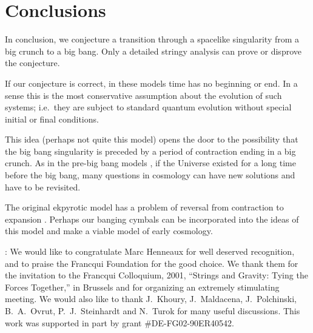 \documentclass[a4paper,12pt,oneside]{article}
\begin{document}
\setcounter{equation}{0}
\section{Conclusions}

In conclusion, we conjecture a transition through a spacelike
singularity from a big crunch to a big bang. Only a detailed
stringy analysis can prove or disprove the conjecture.

If our conjecture is correct, in these models time has no
beginning or end.  In a sense this is the most conservative
assumption about the evolution of such systems; i.e.\ they are
subject to standard quantum evolution without special initial or
final conditions.

This idea (perhaps not quite this model) opens the door to the
possibility that the big bang singularity is preceded by a period
of contraction ending in a big crunch.  As in the pre-big bang
models \cite{PBB}, if the Universe existed for a long time before
the big bang, many questions in cosmology can have new solutions
and have to be revisited.

The original ekpyrotic model \cite{KOST} has a problem of
reversal from contraction to expansion \cite{linde}.  Perhaps our
banging cymbals can be incorporated into the ideas of this model
and make a viable model of early cosmology.

\vspace{5mm}

: We would like to congratulate
Marc Henneaux for well deserved recognition, and to praise the
Francqui Foundation for the good choice.  We thank them for the
invitation to the Francqui Colloquium, 2001, ``Strings and
Gravity: Tying the Forces Together,'' in Brussels and for
organizing an extremely stimulating meeting. We would also like
to thank J.~Khoury, J.~Maldacena, J.~Polchinski, B.~A.~Ovrut,
P.~J.~Steinhardt and N.~Turok for many useful discussions. This
work was supported in part by grant \#DE-FG02-90ER40542.

\vspace{5mm}
\end{document}
